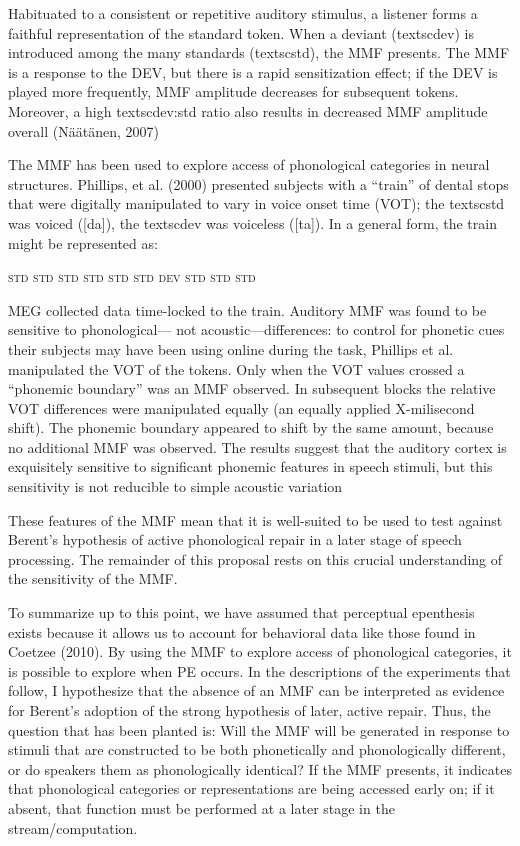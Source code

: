 \documentclass[jou,apacite]{apa6}
\begin{document}
    Habituated to a consistent or repetitive auditory stimulus, a listener forms a faithful representation of the standard token. When a deviant (textsc{dev}) is introduced among the many standards (textsc{std}), the MMF presents. The MMF is a response to the DEV, but there is a rapid sensitization effect; if the DEV is played more frequently, MMF amplitude decreases for subsequent tokens. Moreover, a high textsc{dev:std} ratio also results in decreased MMF amplitude overall (Näätänen, 2007)
    
    The MMF has been used to explore access of phonological categories in neural structures. Phillips, et al. (2000) presented subjects with a “train” of dental stops that were digitally manipulated to vary in voice onset time (VOT); the textsc{std} was voiced ([da]), the textsc{dev} was voiceless ([ta]). In a general form, the train might be represented as:
    
    \textsc{std std std std std std dev std std std}
    
    MEG collected data time-locked to the train. Auditory MMF was found to be sensitive to phonological— not acoustic—differences: to control for phonetic cues their subjects may have been using online during the task, Phillips et al. manipulated the VOT of the tokens. Only when the VOT values crossed a “phonemic boundary” was an MMF observed. In subsequent blocks the relative VOT differences were manipulated equally (an equally applied X-milisecond shift). The phonemic boundary appeared to shift by the same amount, because no additional MMF was observed. The results suggest that the auditory cortex is exquisitely sensitive to significant phonemic features in speech stimuli, but this sensitivity is not reducible to simple acoustic variation
    
    These features of the MMF mean that it is well-suited to be used to test against Berent’s hypothesis of active phonological repair in a later stage of speech processing. The remainder of this proposal rests on this crucial understanding of the sensitivity of the MMF.
    
    To summarize up to this point, we have assumed that perceptual epenthesis exists because it allows us to account for behavioral data like those found in Coetzee (2010). By using the MMF to explore access of phonological categories, it is possible to explore when PE occurs. In the descriptions of the experiments that follow, I hypothesize that the absence of an MMF can be interpreted as evidence for Berent’s adoption of the strong hypothesis of later, active repair. Thus, the question that has been planted is: Will the MMF will be generated in response to stimuli that are constructed to be both phonetically and phonologically different, or do speakers them as phonologically identical? If the MMF presents, it indicates that phonological categories or representations are being accessed early on; if it absent, that function must be performed at a later stage in the stream/computation.
    
\end{document}
